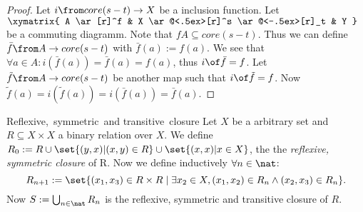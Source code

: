 \begin{answer}
  \begin{proof}
    Let $i \from core(s-t) \to X$ be a inclusion function. Let
    $\xymatrix{
      A \ar[r]^f & X \ar@<.5ex>[r]^s \ar@<-.5ex>[r]_t & Y
    }$
    be a commuting diagramm. Note that $f A \subseteq core(s-t)$.
    Thus we can define $\bar{f} \from A \to core(s-t)$ with $\bar{f}(a) := f(a)$.
    We see that $\forall a \in A: i(\bar{f}(a))=\bar{f}(a)=f(a)$, thus $i \of \bar{f} = f$.
    Let $\tilde{f} \from A \to core(s-t)$ be another map such that $i \of \tilde{f} = f$.
    Now $\tilde{f}(a) = i(\tilde{f}(a)) = i(\bar{f}(a)) = \bar{f}(a)$.
  \end{proof}
\end{answer}

\begin{definition}{Reflexive,\ symmetric\ and transitive\ closure}
  Let $X$ be a arbitrary set and $R \subseteq X \times X$ a binary relation over $X$.
  We define $R_0 := R \cup \set{ (y, x) | (x, y) \in R} \cup \set{ (x, x) | x \in X}$,
  the the \emph{reflexive, symmetric closure} of R.
  Now we define inductively $\forall n \in \nat$:
  \[R_{n+1} := \set{(x_1, x_3) \in R \times R \; | \; \exists x_2 \in X, (x_1, x_2) \in R_n \land (x_2, x_3) \in R_n}.\]
  Now $S := \bigcup_{n \in \nat}{R_n}$ is the reflexive, symmetric and transitive closure of $R$.
\end{definition}

\newcommand{\choice}[1]{\{ #1 \}}
\newcommand{\class} [1]{[ #1 ]}

